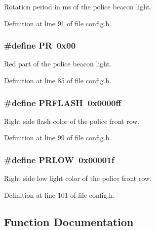 Rotation period in ms of the police beacon light. 



Definition at line 91 of file config.\+h.

\subsubsection[{\texorpdfstring{PR}{PR}}]{\setlength{\rightskip}{0pt plus 5cm}\#define PR~0x00}\hypertarget{group__police_ga088f4c3612d1ab1c9f6f139234ae533b}{}\label{group__police_ga088f4c3612d1ab1c9f6f139234ae533b}


Red part of the police beacon light. 



Definition at line 85 of file config.\+h.

\subsubsection[{\texorpdfstring{P\+R\+F\+L\+A\+SH}{PRFLASH}}]{\setlength{\rightskip}{0pt plus 5cm}\#define P\+R\+F\+L\+A\+SH~0x0000ff}\hypertarget{group__police_gac9d0142b6f8cc7735af13e6b91503b97}{}\label{group__police_gac9d0142b6f8cc7735af13e6b91503b97}


Right side flash color of the police front row. 



Definition at line 99 of file config.\+h.

\subsubsection[{\texorpdfstring{P\+R\+L\+OW}{PRLOW}}]{\setlength{\rightskip}{0pt plus 5cm}\#define P\+R\+L\+OW~0x00001f}\hypertarget{group__police_gaf4a707e896c2e6df7a0215e4100d75aa}{}\label{group__police_gaf4a707e896c2e6df7a0215e4100d75aa}


Right side low light color of the police front row. 



Definition at line 101 of file config.\+h.



\subsection{Function Documentation}
